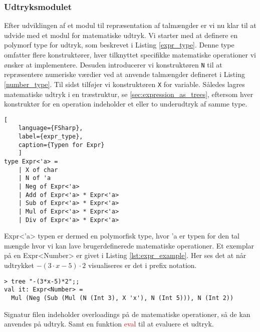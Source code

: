 \documentclass{article}
\begin{document}
\subsubsection{Udtryksmodulet}\label{sec:expression_module}
Efter udviklingen af et modul til repræsentation af talmængder er vi nu klar til at udvide med et modul for matematiske udtryk. Vi starter med at definere en polymorf type for udtryk, som beskrevet i Listing \ref{expr_type}. Denne type omfatter flere konstruktører, hver tilknyttet specifikke matematiske operationer vi ønsker at implementere. Desuden introducerer vi konstruktøren \texttt{N} til at repræsentere numeriske værdier ved at anvende talmængder defineret i Listing \ref{number_type}. Til sidst tilføjer vi konstruktøren \texttt{X} for variable. Således lagres matematiske udtryk i en træstruktur, se \ref{sec:expression_as_trees}, eftersom hver konstruktør for en operation indeholder et eller to underudtryk af samme type.


\begin{lstlisting}[
    language={FSharp}, 
    label={expr_type}, 
    caption={Typen for Expr}
    ]
type Expr<'a> = 
    | X of char
    | N of 'a
    | Neg of Expr<'a>
    | Add of Expr<'a> * Expr<'a>
    | Sub of Expr<'a> * Expr<'a>
    | Mul of Expr<'a> * Expr<'a>
    | Div of Expr<'a> * Expr<'a>
\end{lstlisting}

Expr\textless'a\textgreater{}  typen er dermed en polymorfisk type, hvor 'a er typen for den tal mængde hvor vi kan lave brugerdefinerede matematiske operationer. Et exemplar på en Expr\textless Number\textgreater{}  er givet i Listing \ref{lst:expr_example}. Her ses det at når udtrykket $-(3 \cdot x - 5) \cdot 2$ visualiseres er det i prefix notation.

\begin{lstlisting}[style=output, label={lst:expr_example}, caption={$-(3 \cdot x - 5) \cdot 2$ som et udtryks træ. Funktionen tree bliver beskrevet i \ref{sec:expression_generation}.}]
> tree "-(3*x-5)*2";;
val it: Expr<Number> = 
  Mul (Neg (Sub (Mul (N (Int 3), X 'x'), N (Int 5))), N (Int 2))
\end{lstlisting}

Signatur filen indeholder overloadings på de matematiske operationer, så de kan anvendes på udtryk. Samt en funktion \textcolor{red}{eval} til at evaluere et udtryk. 

\end{document}
